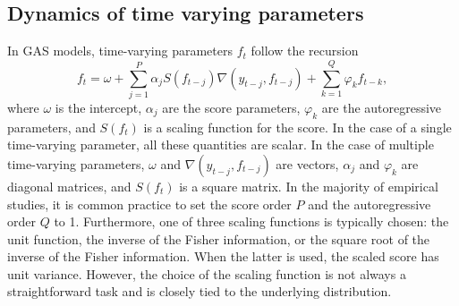 \subsection{Dynamics of time varying parameters}\label{dynamics-of-time-varying-parameters}

In GAS models, time-varying parameters \(f_{t}\) follow the recursion
\begin{equation}
f_{t} = \omega + \sum_{j=1}^P \alpha_j S(f_{t - j}) \nabla(y_{t - j}, f_{t - j}) + \sum_{k=1}^Q \varphi_k f_{t-k},
\label{eq:dynBasic}
\end{equation}
where \(\omega\) is the intercept, \(\alpha_j\) are the score parameters, \(\varphi_k\) are the autoregressive parameters, and \(S(f_t)\) is a scaling function for the score. In the case of a single time-varying parameter, all these quantities are scalar. In the case of multiple time-varying parameters, \(\omega\) and \(\nabla(y_{t - j}, f_{t - j})\) are vectors, \(\alpha_j\) and \(\varphi_k\) are diagonal matrices, and \(S(f_t)\) is a square matrix. In the majority of empirical studies, it is common practice to set the score order \(P\) and the autoregressive order \(Q\) to 1. Furthermore, one of three scaling functions is typically chosen: the unit function, the inverse of the Fisher information, or the square root of the inverse of the Fisher information. When the latter is used, the scaled score has unit variance. However, the choice of the scaling function is not always a straightforward task and is closely tied to the underlying distribution.

